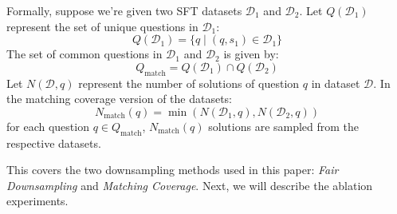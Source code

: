 Formally, suppose we're given two SFT datasets $\mathcal{D}_1$ and $\mathcal{D}_2$. 
Let $Q\left(\mathcal{D}_1\right)$ represent the set of unique questions in $\mathcal{D}_1$:
\[Q\left(\mathcal{D}_1\right) = \{q \mid \left(q, s_1\right) \in \mathcal{D}_1\}\]
The set of common questions in $\mathcal{D}_1$ and $\mathcal{D}_2$ is given by:
\[Q_{\text{match}} = Q\left(\mathcal{D}_1\right) \cap  Q\left(\mathcal{D}_2\right)\]
Let $N\left(\mathcal{D}, q\right)$ represent the number of solutions of question $q$ in dataset $\mathcal{D}$. 
In the matching coverage version of the datasets:
\[
N_\text{match}\left(q\right) = \min\left(N\left(\mathcal{D}_1, q\right), N\left(\mathcal{D}_2, q\right)\right)
\]
for each question $q \in Q_\text{match}$, $N_\text{match}\left(q\right)$ solutions are sampled from the respective datasets.  




This covers the two downsampling methods used in this paper: \emph{Fair Downsampling} and \emph{Matching Coverage}. 
Next, we will describe the ablation experiments.












 



